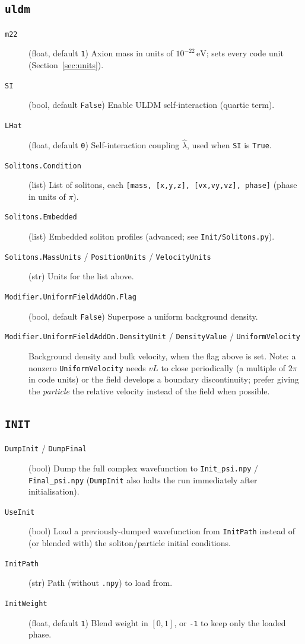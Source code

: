 \documentclass[11pt]{article}
\newcommand{\code}[1]{\texttt{#1}}
\newcommand{\field}[1]{\texttt{#1}}
\begin{document}
\subsection{\field{uldm}}
\begin{description}
  \item[\field{m22}] (float, default \code{1}) Axion mass in units of
    $10^{-22}\,\mathrm{eV}$; sets every code unit (Section~\ref{sec:units}).
  \item[\field{SI}] (bool, default \code{False}) Enable ULDM self-interaction
    (quartic term).
  \item[\field{LHat}] (float, default \code{0}) Self-interaction coupling
    $\hat\lambda$, used when \field{SI} is \code{True}.
  \item[\field{Solitons.Condition}] (list) List of solitons, each
    \code{[mass, [x,y,z], [vx,vy,vz], phase]} (phase in units of $\pi$).
  \item[\field{Solitons.Embedded}] (list) Embedded soliton profiles (advanced;
    see \code{Init/Solitons.py}).
  \item[\field{Solitons.MassUnits} / \field{PositionUnits} / \field{VelocityUnits}]
    (str) Units for the list above.
  \item[\field{Modifier.UniformFieldAddOn.Flag}] (bool, default \code{False})
    Superpose a uniform background density.
  \item[\field{Modifier.UniformFieldAddOn.DensityUnit} / \field{DensityValue} /
    \field{UniformVelocity}] Background density and bulk velocity, when the
    flag above is set. Note: a nonzero \field{UniformVelocity} needs
    $vL$ to close periodically (a multiple of $2\pi$ in code units) or the
    field develops a boundary discontinuity; prefer giving the \emph{particle}
    the relative velocity instead of the field when possible.
\end{description}

\subsection{\field{INIT}}
\begin{description}
  \item[\field{DumpInit} / \field{DumpFinal}] (bool) Dump the full complex
    wavefunction to \code{Init\_psi.npy} / \code{Final\_psi.npy}
    (\field{DumpInit} also halts the run immediately after initialisation).
  \item[\field{UseInit}] (bool) Load a previously-dumped wavefunction from
    \field{InitPath} instead of (or blended with) the soliton/particle
    initial conditions.
  \item[\field{InitPath}] (str) Path (without \code{.npy}) to load from.
  \item[\field{InitWeight}] (float, default \code{1}) Blend weight in
    $[0,1]$, or \code{-1} to keep only the loaded phase.
\end{description}
\end{document}
